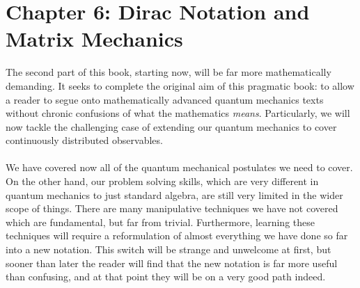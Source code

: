 \chapter{Chapter 6: Dirac Notation and Matrix Mechanics}
The second part of this book, starting now, will be far more mathematically demanding. It seeks to complete the original aim of this pragmatic book: to allow a reader to segue onto mathematically advanced quantum mechanics texts without chronic confusions of what the mathematics \textit{means}. Particularly, we will now tackle the challenging case of extending our quantum mechanics to cover continuously distributed observables.
\\\\
We have covered now all of the quantum mechanical postulates we need to cover. On the other hand, our problem solving skills, which are very different in quantum mechanics to just standard algebra, are still very limited in the wider scope of things. There are many manipulative techniques we have not covered which are fundamental, but far from trivial. Furthermore, learning these techniques will require a reformulation of almost everything we have done so far into a new notation. This switch will be strange and unwelcome at first, but sooner than later the reader will find that the new notation is far more useful than confusing, and at that point they will be on a very good path indeed.
\\\\
